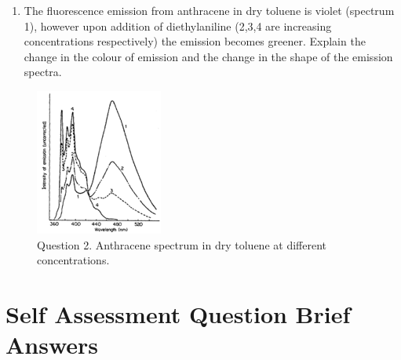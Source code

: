 \documentclass[
]{book}
\providecommand{\tightlist}{%
  \setlength{\itemsep}{0pt}\setlength{\parskip}{0pt}}
\begin{document}
\begin{enumerate}
\def\labelenumi{\arabic{enumi}.}
\setcounter{enumi}{1}
\tightlist
\item
  The fluorescence emission from anthracene in dry toluene is violet (spectrum 1), however upon addition of diethylaniline (2,3,4 are increasing concentrations respectively) the emission becomes greener. Explain the change in the colour of emission and the change in the shape of the emission spectra.
\end{enumerate}

\begin{figure}

{\centering \includegraphics[width=0.7\linewidth]{images/pyrenespec} 

}

\caption{Question 2. Anthracene spectrum in dry toluene at different concentrations.}\label{fig:anthracenespec}
\end{figure}

\hypertarget{sec:saqansex}{%
\section{Self Assessment Question Brief Answers}\label{sec:saqansex}}
\end{document}
